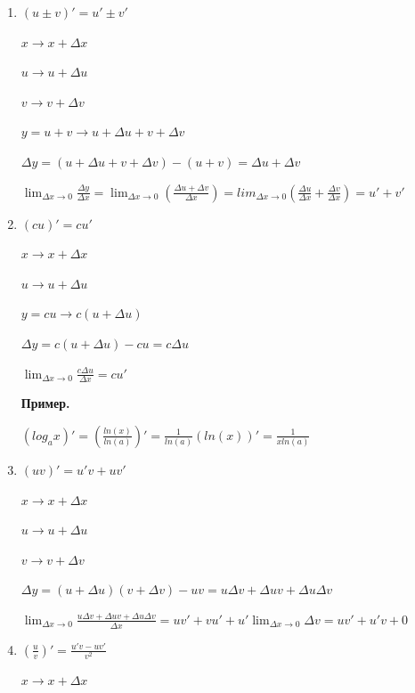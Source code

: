 \documentclass{article}
\begin{document}
    \begin{enumerate}
        \item \( (u \pm v)' = u' \pm v' \)
        
            \( x \to x + \Delta x \)

            \( u \to u + \Delta u \)

            \( v \to v + \Delta v \)

            \( y = u + v \to u + \Delta u + v + \Delta v \)

            \( \Delta y = (u + \Delta u + v + \Delta v) - (u + v) = \Delta u + \Delta v \)

            \( \lim_{\Delta x \to 0} \frac{\Delta y}{\Delta x} = \lim_{\Delta x \to 0} (\frac{\Delta u + \Delta v}{\Delta x}) = lim_{\Delta x \to 0} (\frac{\Delta u}{\Delta x} + \frac{\Delta v}{\Delta x}) = u' + v' \)

        \item \( (cu)' = cu' \)
        
            \( x \to x + \Delta x \)

            \( u \to u + \Delta u \)

            \( y = cu \to c(u + \Delta u) \)

            \( \Delta y = c(u + \Delta u) - cu = c\Delta u \)

            \( \lim_{\Delta x \to 0} \frac{c\Delta u}{\Delta x} = cu' \)

            \textbf{Пример.}

            \((log_a x)' = (\frac{ln(x)}{ln(a)})' = \frac{1}{ln(a)}(ln(x))' = \frac{1}{x ln(a)} \)

        \item \( (uv)' = u'v + uv' \)
        
            \( x \to x + \Delta x \)

            \( u \to u + \Delta u \)

            \( v \to v + \Delta v \)

            \( \Delta y = (u + \Delta u)(v + \Delta v) - uv = u\Delta v + \Delta uv + \Delta u \Delta v \)

            \(\lim_{\Delta x \to 0}{\frac{u\Delta v + \Delta u v + \Delta u \Delta v}{\Delta x}} = uv' + vu' + u'\lim_{\Delta x \to 0}{\Delta v} = uv' + u'v + 0\)

        \item \( (\frac{u}{v})' = \frac{u'v - uv'}{v^2}  \)
        
            \( x \to x + \Delta x \)
            

\end{enumerate}
\end{document}
